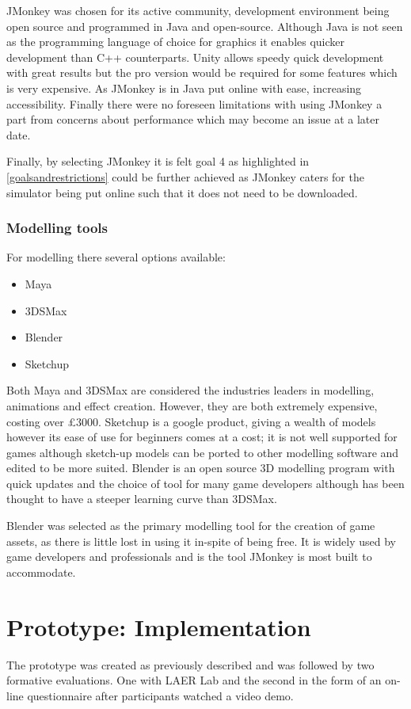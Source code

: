 \documentclass[11pt]{report}
\begin{document}
JMonkey was chosen for its active community, development environment being open source and programmed in Java and open-source. Although Java is not seen as the programming language of choice for graphics it enables quicker development than C++ counterparts. Unity allows speedy quick development with great results but the pro version would be required for some features which is very expensive. As JMonkey is in Java put online with ease, increasing accessibility. Finally there were no foreseen limitations with using JMonkey a part from concerns about performance which may become an issue at a later date.

Finally, by selecting JMonkey it is felt goal 4 as highlighted in \ref{goalsandrestrictions} could be further achieved as JMonkey caters for the simulator being put online such that it does not need to be downloaded.

\subsection{Modelling tools}
For modelling there several options available:
\begin{itemize}
\item Maya
\item 3DSMax
\item Blender
\item Sketchup
\end{itemize}

Both Maya and 3DSMax are considered the industries leaders in modelling, animations and effect creation. However, they are both extremely expensive, costing over £3000. Sketchup is a google product, giving a wealth of models however its ease of use for beginners comes at a cost; it is not well supported for games although sketch-up models can be ported to other modelling software and edited to be more suited. Blender is an open source 3D modelling program with quick updates and the choice of tool for many game developers although has been thought to have a steeper learning curve than 3DSMax.

Blender was selected as the primary modelling tool for the creation of game assets, as there is little lost in using it in-spite of being free. It is widely used by game developers and professionals and is the tool JMonkey is most built to accommodate.

\chapter{Prototype: Implementation}
The prototype was created as previously described and was followed by two formative evaluations. One with LAER Lab and the second in the form of an on-line questionnaire after participants watched a video demo. 
\end{document}
